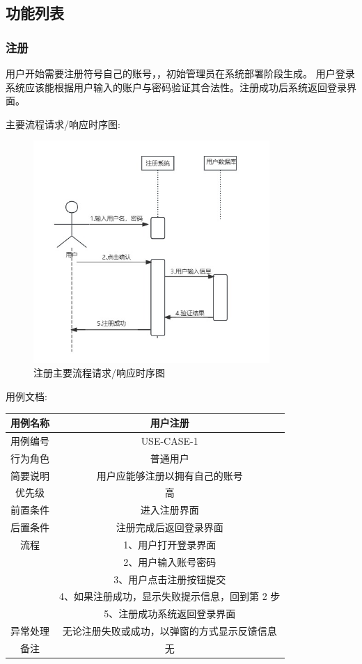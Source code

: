 \documentclass[12pt]{ctexart} %
\begin{document}
\subsection{功能列表}
\subsubsection{注册}
用户开始需要注册符号自己的账号，，初始管理员在系统部署阶段生成。
用户登录系统应该能根据用户输入的账户与密码验证其合法性。注册成功后系统返回登录界面。

主要流程请求/响应时序图:

\begin{figure}[h]
  \centering
  \includegraphics[width=0.8\textwidth]{yongli1.jpg}
  \caption{注册主要流程请求/响应时序图}
\end{figure}

用例文档:

\begin{tabular}{|c|c|}
  \hline
  用例名称& 用户注册\\
  \hline
  用例编号 & USE-CASE-1\\
  \hline
  行为角色 & 普通用户\\
  \hline
  简要说明 & 用户应能够注册以拥有自己的账号\\
  \hline
  优先级 & 高\\
  \hline
  前置条件 & 进入注册界面\\
  \hline
  后置条件 & 注册完成后返回登录界面\\
  \hline
  流程 & 1、用户打开登录界面\\
      & 2、用户输入账号密码\\
      & 3、用户点击注册按钮提交\\
      & 4、如果注册成功，显示失败提示信息，回到第 2 步\\
      & 5、注册成功系统返回登录界面\\
  \hline
  异常处理 & 无论注册失败或成功，以弹窗的方式显示反馈信息\\
  \hline
  备注 & 无\\
  \hline
\end{tabular}
\end{document}
